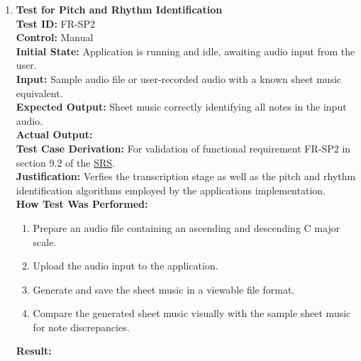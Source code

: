 \documentclass[12pt, titlepage]{article}
\begin{document}
\begin{enumerate}
    \item \textbf{Test for Pitch and Rhythm Identification} \\
      \newline
      \textbf{Test ID:} FR-SP2 \\
      \textbf{Control:} Manual \\
      \textbf{Initial State:} Application is running and idle, awaiting audio input from the user. \\
      \textbf{Input:} Sample audio file or user-recorded audio with a known sheet music equivalent. \\
      \textbf{Expected Output:} Sheet music correctly identifying all notes in the input audio. \\
      \textbf{Actual Output:} \\
      \textbf{Test Case Derivation:} For validation of functional requirement FR-SP2 in section 9.2 of the 
      \href{https://github.com/emilyperica/ScoreGen/blob/main/docs/SRS-Volere/SRS.pdf}{SRS}. \\
      \textbf{Justification:} Verfies the transcription stage as well as the pitch and rhythm identification algorithms employed
      by the applications implementation.\\
      \textbf{How Test Was Performed:}
      \begin{enumerate}
          \item Prepare an audio file containing an ascending and descending C major scale.
          \item Upload the audio input to the application.
          \item Generate and save the sheet music in a viewable file format.
          \item Compare the generated sheet music visually with the sample sheet music for note discrepancies.
      \end{enumerate}
      \textbf{Result:}


\end{enumerate}
\end{document}
